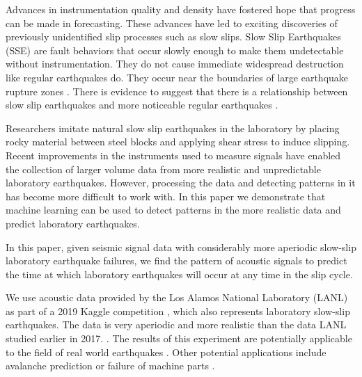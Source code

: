 \documentclass[]{llncs} %
\begin{document}
Advances in instrumentation quality and density have fostered hope that progress can be made in forecasting. These advances have led to exciting discoveries of previously unidentified slip processes such as slow slips. Slow Slip Earthquakes (SSE) are fault behaviors that occur slowly enough to make them undetectable without instrumentation. They do not cause immediate widespread destruction like regular earthquakes do. They occur near the boundaries of large earthquake rupture zones \cite{Slip}. There is evidence to suggest that there is a relationship between slow slip earthquakes and more noticeable regular earthquakes \cite{SlowSlip}. \par

Researchers imitate natural slow slip earthquakes in the laboratory by placing rocky material between steel blocks and applying shear stress to induce slipping. Recent improvements in the instruments \cite{kaggle} used to measure signals have enabled the collection of larger volume data from more realistic and unpredictable laboratory earthquakes. However, processing the data and detecting patterns in it has become more difficult to work with. In this paper we demonstrate that machine learning can be used to detect patterns in the more realistic data and predict laboratory earthquakes. \par

In this paper, given seismic signal data with considerably more aperiodic slow-slip laboratory earthquake failures, we find the pattern of acoustic signals to predict the time at which laboratory earthquakes will occur at any time in the slip cycle. \par

We use acoustic data provided by the Los Alamos National Laboratory (LANL) as part of a 2019 Kaggle competition \cite{kaggle}, which also represents laboratory slow-slip earthquakes. The data is very aperiodic and more realistic than the data LANL studied earlier in 2017. \cite{kaggle}. The results of this experiment are potentially applicable to the field of real world earthquakes \cite{Bertrand}. Other potential applications include avalanche prediction or failure of machine parts \cite{Bertrand}. \par
\end{document}

